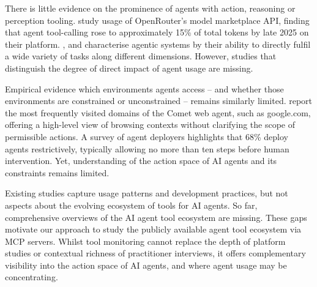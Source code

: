 \documentclass[manuscript,screen,nonacm,oneside]{acmart}
\begin{document}
There is little evidence on the prominence of agents with action, reasoning or perception tooling. \citep{aubakirova2025state} study usage of OpenRouter's model marketplace API, finding that agent tool-calling rose to approximately 15\% of total tokens by late 2025 on their platform. \citep{kasirzadeh2025characterizing}, \citep{staufer20262025aiagentindex} and \citep{casper2025agent} characterise agentic systems by their ability to directly fulfil a wide variety of tasks along different dimensions. However, studies that distinguish the degree of direct impact of agent usage are missing.

Empirical evidence which environments agents access -- and whether those environments are constrained or unconstrained -- remains similarly limited. \citep{yang2025adoption} report the most frequently visited domains of the Comet web agent, such as google.com, offering a high-level view of browsing contexts without clarifying the scope of permissible actions. A survey of agent deployers \citep{pan2025measuring} highlights that 68\% deploy agents restrictively, typically allowing no more than ten steps before human intervention. Yet, understanding of the action space of AI agents and its constraints remains limited.

Existing studies capture usage patterns and development practices, but not aspects about the evolving ecosystem of tools for AI agents. So far, comprehensive overviews of the AI agent tool ecosystem are missing. These gaps motivate our approach to study the publicly available agent tool ecosystem via MCP servers. Whilst tool monitoring cannot replace the depth of platform studies or contextual richness of practitioner interviews, it offers complementary visibility into the action space of AI agents, and where agent usage may be concentrating. 
\end{document}
